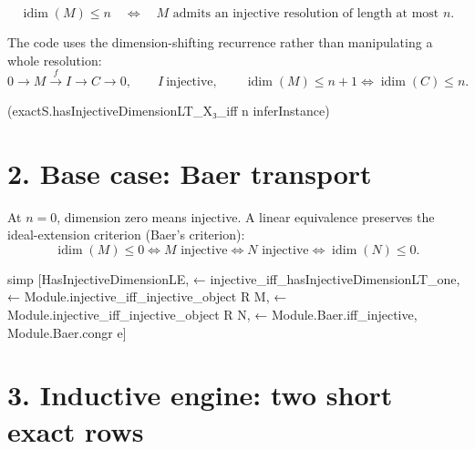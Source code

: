 \documentclass[10pt]{article}
\newenvironment{lean}{\Verbatim[fontsize=\scriptsize,frame=single,framesep=1.5mm,rulecolor=\color{blue},formatcom=\leanfont]}{\endVerbatim}
\newcommand{\injdim}{\operatorname{idim}}
\begin{document}
\[
\injdim(M)\le n
\quad\Longleftrightarrow\quad
\text{$M$ admits an injective resolution of length at most $n$}.
\]

The code uses the dimension-shifting recurrence rather than manipulating a whole resolution:
\[
0\longrightarrow M\xrightarrow{f}I\longrightarrow C\longrightarrow0,
\qquad I\ \text{injective},
\qquad
\boxed{\injdim(M)\le n+1\iff\injdim(C)\le n.}
\]

\begin{lean}
(exactS.hasInjectiveDimensionLT_X₃_iff n inferInstance)
\end{lean}

\begin{center}
\end{center}

\section*{2. Base case: Baer transport}

At $n=0$, dimension zero means injective.  A linear equivalence preserves the ideal-extension
criterion (Baer's criterion):
\[
\injdim(M)\le0\iff M\text{ injective}
\iff N\text{ injective}\iff\injdim(N)\le0.
\]

\begin{lean}
simp [HasInjectiveDimensionLE, ← injective_iff_hasInjectiveDimensionLT_one,
  ← Module.injective_iff_injective_object R M,
  ← Module.injective_iff_injective_object R N,
  ← Module.Baer.iff_injective, Module.Baer.congr e]
\end{lean}

\newpage
\section*{3. Inductive engine: two short exact rows}
\end{document}
